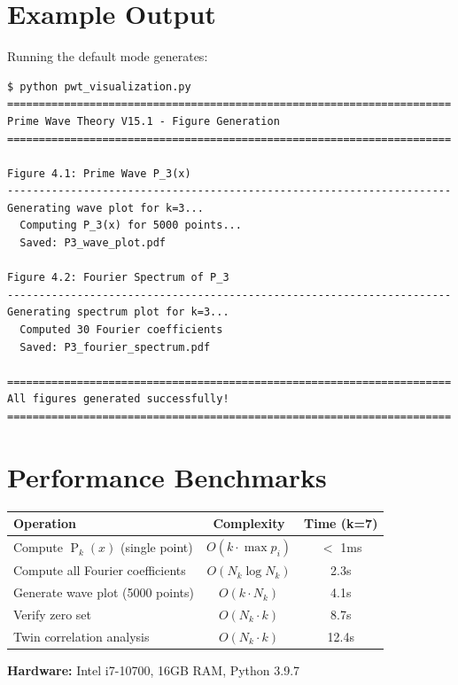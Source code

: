 ﻿\documentclass[12pt,a4paper]{report}
\theoremstyle{plain}
\theoremstyle{definition}
\DeclareMathOperator{\Pk}{P}
\begin{document}
\section{Example Output}

Running the default mode generates:
\begin{verbatim}
$ python pwt_visualization.py
======================================================================
Prime Wave Theory V15.1 - Figure Generation
======================================================================

Figure 4.1: Prime Wave P_3(x)
----------------------------------------------------------------------
Generating wave plot for k=3...
  Computing P_3(x) for 5000 points...
  Saved: P3_wave_plot.pdf

Figure 4.2: Fourier Spectrum of P_3
----------------------------------------------------------------------
Generating spectrum plot for k=3...
  Computed 30 Fourier coefficients
  Saved: P3_fourier_spectrum.pdf

======================================================================
All figures generated successfully!
======================================================================
\end{verbatim}

\section{Performance Benchmarks}

\begin{center}
\begin{tabular}{lcc}
\toprule
\textbf{Operation} & \textbf{Complexity} & \textbf{Time (k=7)} \\
\midrule
Compute $\Pk_k(x)$ (single point) & $O(k \cdot \max p_i)$ & $<$ 1ms \\
Compute all Fourier coefficients & $O(N_k \log N_k)$ & 2.3s \\
Generate wave plot (5000 points) & $O(k \cdot N_k)$ & 4.1s \\
Verify zero set & $O(N_k \cdot k)$ & 8.7s \\
Twin correlation analysis & $O(N_k \cdot k)$ & 12.4s \\
\bottomrule
\end{tabular}
\end{center}

\vspace{0.3cm}
\textbf{Hardware:} Intel i7-10700, 16GB RAM, Python 3.9.7
\end{document}
